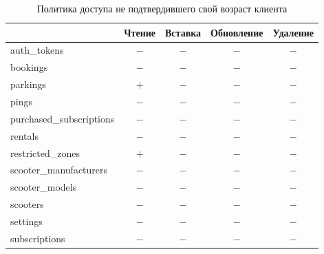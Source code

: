 \begin{table}[H]
	\begin{threeparttable}[b]
		\caption{Политика доступа не подтвердившего свой возраст клиента}
		\label{tbl:pending-client-policy}
		{\renewcommand{\arraystretch}{1.2}
			\begin{tabularx}{\textwidth}
				{
					| >{\raggedright\arraybackslash}X
					| >{\centering\arraybackslash}c
					| >{\centering\arraybackslash}c
					| >{\centering\arraybackslash}c
					| >{\centering\arraybackslash}c |
				}
				\hline
				                         & \textbf{Чтение} & \textbf{Вставка} & \textbf{Обновление} & \textbf{Удаление} \\
				\hline
				auth\_tokens             & $-$             & $-$              & $-$                 & $-$               \\
				\hline
				bookings                 & $-$             & $-$              & $-$                 & $-$               \\
				\hline
				parkings                 & $+$             & $-$              & $-$                 & $-$               \\
				\hline
				pings                    & $-$             & $-$              & $-$                 & $-$               \\
				\hline
				purchased\_subscriptions & $-$             & $-$              & $-$                 & $-$               \\
				\hline
				rentals                  & $-$             & $-$              & $-$                 & $-$               \\
				\hline
				restricted\_zones        & $+$             & $-$              & $-$                 & $-$               \\
				\hline
				scooter\_manufacturers   & $-$             & $-$              & $-$                 & $-$               \\
				\hline
				scooter\_models          & $-$             & $-$              & $-$                 & $-$               \\
				\hline
				scooters                 & $-$             & $-$              & $-$                 & $-$               \\
				\hline
				settings                 & $-$             & $-$              & $-$                 & $-$               \\
				\hline
				subscriptions            & $-$             & $-$              & $-$                 & $-$               \\

\end{tabularx}}
\end{threeparttable}
\end{table}
